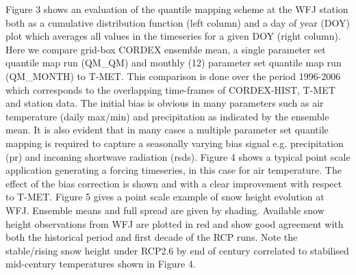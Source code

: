 \documentclass[hess, manuscript]{copernicus}
\begin{document}
Figure 3 shows an evaluation of the quantile mapping scheme at the WFJ station both as a cumulative distribution function (left column) and a day of year (DOY) plot which averages all values in the timeseries for a given DOY (right column). Here we compare grid-box CORDEX ensemble mean, a single parameter set quantile map run (QM\_QM) and monthly (12) parameter set quantile map run (QM\_MONTH) to T-MET. This comparison is done over the period 1996-2006 which corresponds to the overlapping time-frames of CORDEX-HIST, T-MET and station data. The initial bias is obvious in many parameters such as air temperature (daily max/min) and precipitation as indicated by the ensemble mean. It is also evident that in many cases a multiple parameter set quantile mapping is required to capture a seasonally varying bias signal e.g. precipitation (pr) and incoming shortwave radiation (rsds). 
Figure 4 shows a typical point scale application generating a forcing timeseries, in this case for air temperature. The effect of the bias correction is shown and with a clear improvement with respect to T-MET.
Figure 5 gives a point scale example of snow height evolution at WFJ. Ensemble means and full spread are given by shading. Available snow height observations from WFJ are plotted in red and show good agreement with both the historical period and first decade of the RCP runs. Note the stable/rising snow height under RCP2.6 by end of century correlated to stabilised mid-century temperatures shown in Figure 4.
\end{document}
